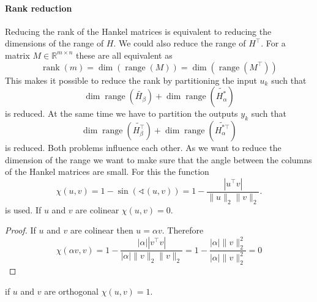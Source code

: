 \documentclass[numbers=noenddot,doctype=mastersthesis,BCOR=15mm,biblatex]{ldvbook}%
\DeclareMathOperator{\rank}{rank}
\DeclareMathOperator{\range}{range}
\begin{document}
\paragraph{Rank reduction}
Reducing the rank of the Hankel matrices is equivalent to reducing the dimensions of the range of $H$.
We could also reduce the range of $H^\top$.
For a matrix $M\in \mathbb{R}^{m\times n}$ these are all equivalent as 
\begin{equation}
\rank(m) = \dim(\range(M)) = \dim(\range(M^\top))
\end{equation}
This makes it possible to reduce the rank by partitioning the input $u_k$ such that 
\begin{equation}
\dim\range(\tilde{H_\beta}) + \dim\range(\tilde{H_\alpha^*})
\end{equation}
is reduced. At the same time we have to partition the outputs $y_k$ such that 
\begin{equation}
\dim\range(\tilde{H^\top_\beta}) + \dim\range(\tilde{H_\alpha^{*\top}})
\end{equation}
is reduced.
Both problems influence each other.
As we want to reduce the dimension of the range we want to make sure that the angle between the columns of the Hankel matrices are small. %
For this the function 
\begin{equation}
\chi(u,v) =  1-\sin(\sphericalangle(u,v)) =1-\frac{|u^\top v|}{\|u\|_2\|v\|_2}
.
\end{equation}
is used.
If $u$ and $v$ are colinear $\chi(u,v) = 0$.
\begin{proof}
	If $u$ and $v$ are colinear then $u = \alpha v$. Therefore
	\begin{equation}
	\chi(\alpha v,v) = 1-\frac{|\alpha| |v^\top v|}{|\alpha|\|v\|_2\|v\|_2}= 1-\frac{|\alpha| \|v\|_2^2}{|\alpha| \|v\|_2^2} = 0
	\end{equation}
\end{proof}
if $u$ and $v$ are orthogonal $\chi(u,v) = 1$.
\end{document}
